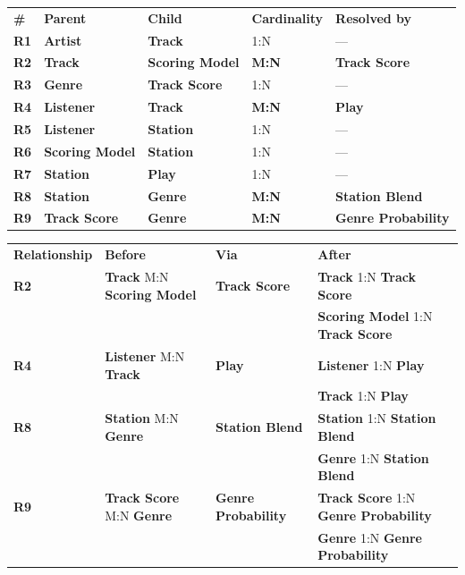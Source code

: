 \documentclass[11pt]{article}
\newcommand{\ent}[1]{\textcolor{entc}{\textbf{#1}}}
\newcommand{\asc}[1]{\textcolor{ascc}{\textbf{#1}}}
\newcommand{\rel}[1]{\textcolor{relc}{\textbf{#1}}}
\begin{document}
\begin{longtable}{|L{0.40in}|L{1.45in}|L{1.45in}|L{0.95in}|L{1.85in}|}
\hline
{} \\ \hline
{}\textbf{\#} & \textbf{Parent} & \textbf{Child} & \textbf{Cardinality} & \textbf{Resolved by} \\ \hline
\rel{R1} & \ent{Artist} & \ent{Track} & 1:N & --- \\ \hline
\rel{R2} & \ent{Track} & \ent{Scoring Model} & \textbf{M:N} & \asc{Track Score} \\ \hline
\rel{R3} & \ent{Genre} & \asc{Track Score} & 1:N & --- \\ \hline
\rel{R4} & \ent{Listener} & \ent{Track} & \textbf{M:N} & \asc{Play} \\ \hline
\rel{R5} & \ent{Listener} & \ent{Station} & 1:N & --- \\ \hline
\rel{R6} & \ent{Scoring Model} & \ent{Station} & 1:N & --- \\ \hline
\rel{R7} & \ent{Station} & \asc{Play} & 1:N & --- \\ \hline
\rel{R8} & \ent{Station} & \ent{Genre} & \textbf{M:N} & \asc{Station Blend} \\ \hline
\rel{R9} & \asc{Track Score} & \ent{Genre} & \textbf{M:N} & \asc{Genre Probability} \\ \hline
\end{longtable}

\begin{longtable}{|L{1.00in}|L{1.90in}|L{1.20in}|L{2.15in}|}
\hline
{} \\ \hline
{}\textbf{Relationship} & \textbf{Before} & \textbf{Via} & \textbf{After} \\ \hline
\rel{R2} & \ent{Track} M:N \ent{Scoring Model} & \asc{Track Score} & \ent{Track} 1:N \asc{Track Score} \\ \hline
 & & & \ent{Scoring Model} 1:N \asc{Track Score} \\ \hline
\rel{R4} & \ent{Listener} M:N \ent{Track} & \asc{Play} & \ent{Listener} 1:N \asc{Play} \\ \hline
 & & & \ent{Track} 1:N \asc{Play} \\ \hline
\rel{R8} & \ent{Station} M:N \ent{Genre} & \asc{Station Blend} & \ent{Station} 1:N \asc{Station Blend} \\ \hline
 & & & \ent{Genre} 1:N \asc{Station Blend} \\ \hline
\rel{R9} & \asc{Track Score} M:N \ent{Genre} & \asc{Genre Probability} & \asc{Track Score} 1:N \asc{Genre Probability} \\ \hline
 & & & \ent{Genre} 1:N \asc{Genre Probability} \\ \hline
\end{longtable}
\end{document}
